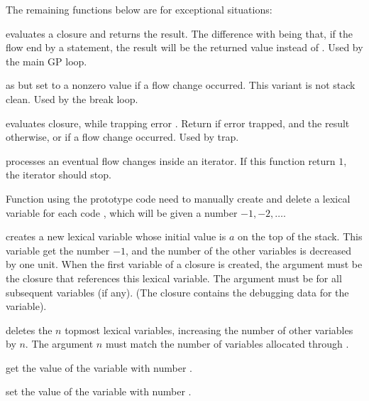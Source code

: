 The remaining functions below are for exceptional situations:

 evaluates a closure and returns the result.
The difference with  being that, if the flow end by a
 statement, the result will be the returned value instead of
. Used by the main GP loop.

 as 
but set  to a nonzero value if a flow change occurred. This
variant is not stack clean. Used by the break loop.

 evaluates closure, while
trapping error . Return  if error trapped, and the
result otherwise, or  if a flow change occurred. Used by trap.



 processes an eventual flow changes inside an
iterator. If this function return $1$, the iterator should stop.

\label{se:pushlex}

Function using the prototype code  need to manually create and delete a
lexical variable for each code , which will be given a number $-1, -2,
\ldots$.

 creates a new lexical variable whose
initial value is $a$ on the top of the stack. This variable get the number
$-1$, and the number of the other variables is decreased by one unit. When
the first variable of a closure is created, the argument  must be the
closure that references this lexical variable. The argument  must be
 for all subsequent variables (if any).  (The closure contains the
debugging data for the variable).

 deletes the $n$ topmost lexical variables,
increasing the number of other variables by $n$. The argument $n$ must match
the number of variables allocated through .

 get the value of the variable with number .

 set the value of the variable with number
.



